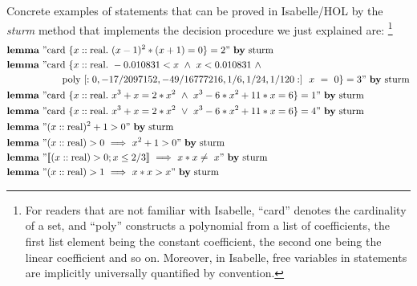 \documentclass[11pt,a4paper,oneside]{article}
\newcommand{\ilemma}{\textbf{lemma}}
\newcommand{\card}{\textrm{card}}
\newcommand{\real}{\textrm{real}}
\newcommand{\isabellehol}{\mbox{Isabelle}\slash HOL\xspace}
\begin{document}
Concrete examples of statements that can be proved in \isabellehol by the \emph{sturm} method that implements the decision procedure we just explained are:
\footnote{For readers that are not familiar with Isabelle, \enquote{card} denotes the cardinality of a set, and \enquote{poly} constructs a polynomial from a list of coefficients, the first list element being the constant coefficient, the second one being the linear coefficient and so on. Moreover, in Isabelle, free variables in statements are implicitly universally quantified by convention.}
\begin{align*}
&\ilemma\ "\card\ \{x::\real.\ (x - 1)^2 * (x + 1) = 0\} = 2"\ \textrm{\textbf{by}\ sturm}\\
&\ilemma\ "\mathrm{card}\ \{x::\mathrm{real}.\ -0.010831 < x\ \wedge\ x < 0.010831\ \wedge\\
&\hskip20mm \mathrm{poly}\ [:0, -17/2097152, -49/16777216, 1/6, 1/24, 1/120:]\ \ x\ =\ 0\} = 3"\ \textrm{\textbf{by}\ sturm}\\
&\ilemma\ "\card\ \{x::\real.\ x^3 + x = 2*x^2\ \wedge\ x^3-6*x^2+11*x=6\} = 1"\ \textrm{\textbf{by}\ sturm}\\
&\ilemma\ "\card\ \{x::\real.\ x^3 + x = 2*x^2\ \vee\ x^3-6*x^2+11*x=6\} = 4"\ \textrm{\textbf{by}\ sturm}\\
&\ilemma\ "(x::\real)^2+1 > 0"\ \textrm{\textbf{by}\ sturm}\\
&\ilemma\ "(x::\real) > 0\ \Longrightarrow\ x^2+1 > 0"\ \textrm{\textbf{by}\ sturm}\\
&\ilemma\ "\llbracket (x::\real) > 0; x \leq 2/3\rrbracket\ \Longrightarrow\ x*x \neq\ x"\ \textrm{\textbf{by}\ sturm}\\
&\ilemma\ "(x::\real) > 1\ \Longrightarrow\ x*x > x"\ \textrm{\textbf{by}\ sturm}\\
\end{align*}
\end{document}

